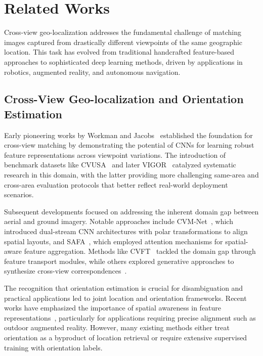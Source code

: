 \section{Related Works}
\label{sec:related_works}

Cross-view geo-localization addresses the fundamental challenge of matching images captured from drastically different viewpoints of the same geographic location. This task has evolved from traditional handcrafted feature-based approaches to sophisticated deep learning methods, driven by applications in robotics, augmented reality, and autonomous navigation.

\subsection{Cross-View Geo-localization and Orientation Estimation}

Early pioneering works by Workman and Jacobs~\cite{workman2015predicting,workman2015learning} established the foundation for cross-view matching by demonstrating the potential of CNNs for learning robust feature representations across viewpoint variations. The introduction of benchmark datasets like CVUSA~\cite{workman2015predicting} and later VIGOR~\cite{zhu2021vigor} catalyzed systematic research in this domain, with the latter providing more challenging same-area and cross-area evaluation protocols that better reflect real-world deployment scenarios.

Subsequent developments focused on addressing the inherent domain gap between aerial and ground imagery. Notable approaches include CVM-Net~\cite{hu2018cvm}, which introduced dual-stream CNN architectures with polar transformations to align spatial layouts, and SAFA~\cite{NEURIPS2019_ba2f0015}, which employed attention mechanisms for spatial-aware feature aggregation. Methods like CVFT~\cite{shi2019optimalfeaturetransportcrossview} tackled the domain gap through feature transport modules, while others explored generative approaches to synthesize cross-view correspondences~\cite{regmi2018cross}.

The recognition that orientation estimation is crucial for disambiguation and practical applications led to joint location and orientation frameworks. Recent works have emphasized the importance of spatial awareness in feature representations~\cite{shi2020ilookingatjoint}, particularly for applications requiring precise alignment such as outdoor augmented reality. However, many existing methods either treat orientation as a byproduct of location retrieval or require extensive supervised training with orientation labels.

